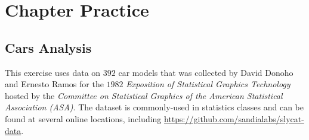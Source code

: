 \section{Chapter Practice}

\subsection{Cars Analysis}

This exercise uses data on $ 392 $ car models that was collected by David Donoho and Ernesto Ramos for the $ 1982 $ \textit{Exposition of Statistical Graphics Technology} hosted by the \textit{Committee on Statistical Graphics of the American Statistical Association (ASA)}. The dataset is commonly-used in statistics classes and can be found at several online locations, including \url{https://github.com/sandialabs/slycat-data}.

